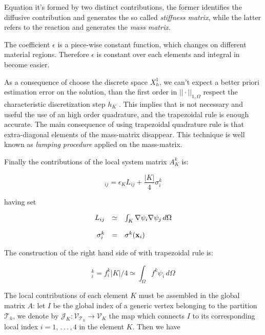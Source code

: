 Equation  it's formed by two distinct contributions, the former identifies the diffusive contribution and generates the so called \textit{stiffness matrix}, while the latter refers to the reaction and generates the \textit{mass matrix}.

The coefficient $\epsilon$ is a piece-wise constant function, which changes on different material regions. Therefore $\epsilon$ is constant over each elements and integral in  become easier.

As a consequence of choose the discrete space $X^1_{h}$,  we can't expect a better priori estimation error on the solution, than the first order in $||\cdot||_{1,\Omega}$ respect the characteristic discretization step $h_K$ \cite{quarteroni:modnum}. This implies that is not necessary and useful the use of an high order quadrature, and the trapezoidal rule is enough accurate. 
The main consequence of using trapezoidal quadrature rule is that extra-diagonal elements of the mass-matrix disappear.
This technique is well known as \textit{lumping procedure} applied on the mass-matrix.

Finally the contributions of the local system matrix $A_K^k$ is:

\begin{equation}
[A_K^k]_{ij}  = \epsilon_K
L_{ij}
+
\dfrac{|K|}{4} \sigma^k_i
\end{equation}

having set

\begin{equation}
\begin{array}{rcl}
L_{ij} & \simeq & \int_K \nabla \psi_i  \nabla \psi_j \, d\Omega \\ \\
\sigma^k_i & =  &\sigma^k(\mathbf{x}_i)
\end{array}
\end{equation}

The construction of the right hand side of  with trapezoidal rule is:

\begin{equation}
[F_K]_i^k =  f^k_i |K| / 4 \simeq \int_{\Omega} f^k \psi_i \, d\Omega 
\end{equation}

The local contributions of each element $K$ must be assembled in the global matrix $A$: let $I$ be the global index of a generic vertex belonging to the partition $\mathcal{T}_h$, we denote by $\mathcal{J}_K: \mathcal{V}_{\mathcal{T}_h} \rightarrow \mathcal{V}_{K}$ the map which connects $I$ to its corresponding local index $i=1, \, . \, . \, . \, , 4$ in the element $K$. Then we have 

